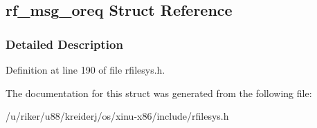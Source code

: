 \hypertarget{structrf__msg__oreq}{}\subsection{rf\+\_\+msg\+\_\+oreq Struct Reference}
\label{structrf__msg__oreq}


\subsubsection{Detailed Description}


Definition at line 190 of file rfilesys.\+h.



The documentation for this struct was generated from the following file\+:\begin{DoxyCompactItemize}
\item 
/u/riker/u88/kreiderj/os/xinu-\/x86/include/rfilesys.\+h\end{DoxyCompactItemize}

